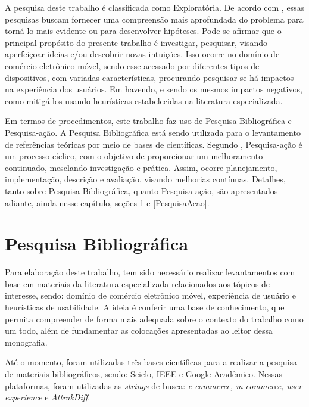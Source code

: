 A pesquisa deste trabalho é classificada como Exploratória. De acordo com , essas pesquisas buscam fornecer uma compreensão mais aprofundada do problema para torná-lo mais evidente ou para desenvolver hipóteses. Pode-se afirmar que o principal propósito do presente trabalho é investigar, pesquisar, visando aperfeiçoar ideias e/ou descobrir novas intuições. Isso ocorre no domínio de comércio eletrônico móvel, sendo esse acessado por diferentes tipos de dispositivos, com variadas características, procurando pesquisar se há impactos na experiência dos usuários. Em havendo, e sendo os mesmos impactos negativos, como mitigá-los usando heurísticas estabelecidas na literatura especializada.

Em termos de procedimentos, este trabalho faz uso de Pesquisa Bibliográfica e Pesquisa-ação. A Pesquisa Bibliográfica está sendo utilizada para o levantamento de referências teóricas por meio de bases de científicas. Segundo , Pesquisa-ação é um processo cíclico, com o objetivo de proporcionar um melhoramento continuado, mesclando investigação e prática. Assim, ocorre planejamento, implementação, descrição e avaliação, visando melhorias contínuas. Detalhes, tanto sobre Pesquisa Bibliográfica, quanto Pesquisa-ação, são apresentados adiante, ainda nesse capítulo, seções \ref{PesquisaBibliografica} e \ref{PesquisaAcao}.


\section{Pesquisa Bibliográfica}
\label{PesquisaBibliografica}

Para elaboração deste trabalho, tem sido necessário realizar levantamentos com base em materiais da literatura especializada relacionados aos tópicos de interesse, sendo: domínio de comércio eletrônico móvel, experiência de usuário e heurísticas de usabilidade. A ideia é conferir uma base de conhecimento, que permita compreender de forma mais adequada sobre o contexto do trabalho como um todo, além de fundamentar as colocações apresentadas ao leitor dessa monografia.

Até o momento, foram utilizadas três bases cientificas para a realizar a pesquisa de materiais bibliográficos, sendo: Scielo, IEEE e Google Acadêmico. Nessas plataformas, foram utilizadas as \textit{strings} de busca: \textit{e-commerce, m-commerce, user experience} e \textit{AttrakDiff}.

